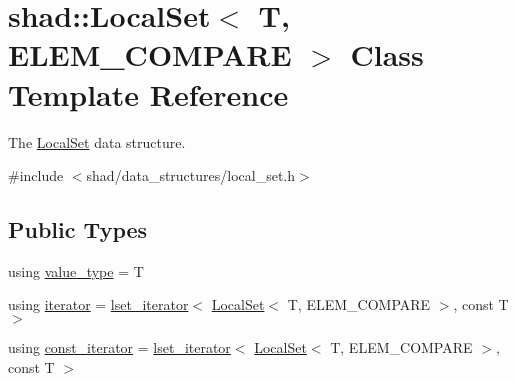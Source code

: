 \hypertarget{classshad_1_1LocalSet}{\section{shad\-:\-:Local\-Set$<$ T, E\-L\-E\-M\-\_\-\-C\-O\-M\-P\-A\-R\-E $>$ Class Template Reference}
\label{classshad_1_1LocalSet}
}


The \hyperlink{classshad_1_1LocalSet}{Local\-Set} data structure.  




{\ttfamily \#include $<$shad/data\-\_\-structures/local\-\_\-set.\-h$>$}

\subsection*{Public Types}
\begin{DoxyCompactItemize}
\item 
using \hyperlink{classshad_1_1LocalSet_a2116351b475e6f8cb21f78f11486e9e7}{value\-\_\-type} = T
\item 
using \hyperlink{classshad_1_1LocalSet_a90ad05d816b6336fea56e6511093d4f6}{iterator} = \hyperlink{classshad_1_1lset__iterator}{lset\-\_\-iterator}$<$ \hyperlink{classshad_1_1LocalSet}{Local\-Set}$<$ T, E\-L\-E\-M\-\_\-\-C\-O\-M\-P\-A\-R\-E $>$, const T $>$
\item 
using \hyperlink{classshad_1_1LocalSet_a3a1104a2552f91dcdf37b057440ba182}{const\-\_\-iterator} = \hyperlink{classshad_1_1lset__iterator}{lset\-\_\-iterator}$<$ \hyperlink{classshad_1_1LocalSet}{Local\-Set}$<$ T, E\-L\-E\-M\-\_\-\-C\-O\-M\-P\-A\-R\-E $>$, const T $>$
\end{DoxyCompactItemize}

